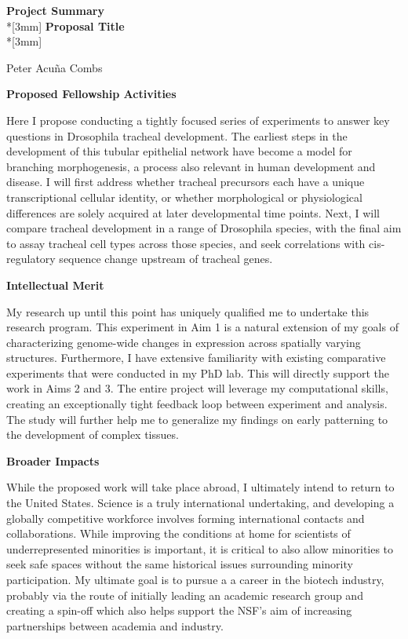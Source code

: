 \documentclass{proposal}
\begin{document}
\begin{center}
{\Large{\bf Project Summary}}\\*[3mm]
{\bf Proposal Title} \\*[3mm]

Peter Acu\~na Combs \\

\end{center}

\noindent
{\bf Proposed Fellowship Activities}

Here I propose conducting a tightly focused series of experiments to answer key questions in Drosophila tracheal development. The earliest steps in the development of this tubular epithelial network have become a model for branching morphogenesis, a process also relevant in human development and disease. I will first address whether tracheal precursors each have a unique transcriptional cellular identity, or whether morphological or physiological differences are solely acquired at later developmental time points. Next, I will compare tracheal development in a range of Drosophila species, with the final aim to assay tracheal cell types across those species, and seek correlations with cis-regulatory sequence change upstream of tracheal genes.

\noindent
{\bf Intellectual Merit}

My research up until this point has uniquely qualified me to undertake this research program. This experiment in Aim 1 is a natural extension of my goals of characterizing genome-wide changes in expression across spatially varying structures.  Furthermore,  I have extensive familiarity with existing comparative experiments that were conducted in my PhD lab. This will directly support the work in Aims 2 and 3. The entire project will leverage my computational skills, creating an exceptionally tight feedback loop between experiment and analysis. The study will further help me to generalize my findings on early patterning to the development of complex tissues.

\noindent
{\bf Broader Impacts}

While the proposed work will take place abroad, I ultimately intend to return to the United States.  Science is a truly international undertaking, and developing a globally competitive workforce involves forming international contacts and collaborations. While improving the conditions at home for scientists of underrepresented minorities is important, it is critical to also allow minorities to seek safe spaces without the same historical issues surrounding minority participation.  My ultimate goal is to pursue a a career in the biotech industry, probably via the route of initially leading an academic research group and creating a spin-off which also helps support the NSF's aim of increasing partnerships between academia and industry. 
\end{document}
